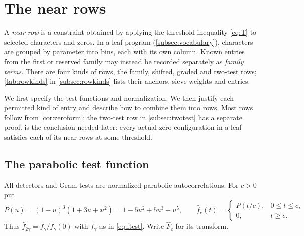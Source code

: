 \documentclass[11pt]{amsart}
\numberwithin{equation}{section}
\theoremstyle{plain}
\theoremstyle{definition}
\theoremstyle{remark}
\newcommand{\1}{\mathbf{1}}
\begin{document}
\section{The near rows}\label{sec:rows}

A \emph{near row} is a constraint obtained by applying the threshold inequality
\eqref{eq:T} to selected characters and zeros. In a leaf program (\cref{subsec:vocabulary}),
characters are grouped by parameter into bins, each with its own column. Known entries from the
first or reserved family may instead be recorded separately as \emph{family terms}. There are
four kinds of rows, the family, shifted, graded and two-test rows; \cref{tab:rowkinds} in
\cref{subsec:rowkinds} lists their anchors, sieve weights and entries.

We first specify the test functions and normalization. We then justify each permitted
kind of entry and describe how to combine them into rows. Most rows follow from
\cref{cor:zeroform}; the two-test row in \cref{subsec:twotest} has a separate proof.
 is the conclusion needed later: every actual zero configuration
in a leaf satisfies each of its near rows at some threshold.

\subsection{The parabolic test function}
All detectors and Gram tests are normalized parabolic autocorrelations. For $c>0$ put
\[
  P(u)=(1-u)^3(1+3u+u^2)=1-5u^2+5u^3-u^5,\qquad
  \hat f_c(t)=\begin{cases}P(t/c),&0\le t\le c,\\0,&t\ge c.\end{cases}
\]
Thus $\hat f_{2\gamma}=f_\gamma/f_\gamma(0)$ with $f_\gamma$ as in \eqref{eq:ftest}. Write $\hat F_c$ for its
transform.
\end{document}

